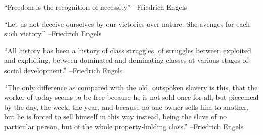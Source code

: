 \documentclass{article}%
\begin{document}
\linebreak%
\vspace{1mm}%
\begin{minipage}{\textwidth}%
\flushleft%
“Freedom is the recognition of necessity”%
\linebreak%
\vspace{1mm}%
–Friedrich Engels%
\linebreak%
\vspace{1mm}%
\end{minipage}%
\linebreak%
\vspace{1mm}%
\begin{minipage}{\textwidth}%
\flushleft%
“Let us not deceive ourselves by our victories over nature. She avenges for each such victory.”%
\linebreak%
\vspace{1mm}%
–Friedrich Engels%
\linebreak%
\vspace{1mm}%
\end{minipage}%
\linebreak%
\vspace{1mm}%
\begin{minipage}{\textwidth}%
\flushleft%
“All history has been a history of class struggles, of struggles between exploited and exploiting, between dominated and dominating classes at various stages of social development.”%
\linebreak%
\vspace{1mm}%
–Friedrich Engels%
\linebreak%
\vspace{1mm}%
\end{minipage}%
\linebreak%
\vspace{1mm}%
\begin{minipage}{\textwidth}%
\flushleft%
“The only difference as compared with the old, outspoken slavery is this, that the worker of today seems to be free because he is not sold once for all, but piecemeal by the day, the week, the year, and because no one owner sells him to another, but he is forced to sell himself in this way instead, being the slave of no particular person, but of the whole property{-}holding class.”%
\linebreak%
\vspace{1mm}%
–Friedrich Engels%
\linebreak%
\vspace{1mm}%
\end{minipage}%
\end{document}
